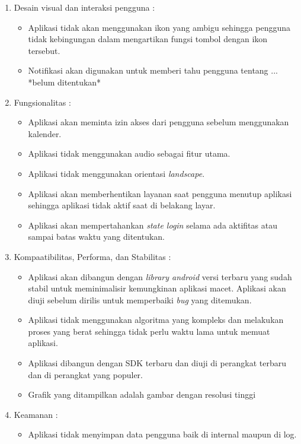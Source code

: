 \begin{enumerate}
    \item Desain visual dan interaksi pengguna : 
    \begin{itemize}
        \item Aplikasi tidak akan menggunakan ikon yang ambigu sehingga pengguna tidak kebingungan dalam mengartikan fungsi tombol dengan ikon tersebut. 
        \item Notifikasi akan digunakan untuk memberi tahu pengguna tentang  ...  *belum ditentukan*
    \end{itemize}
    \item Fungsionalitas : 
    \begin{itemize}
        \item Aplikasi akan meminta izin akses dari pengguna sebelum menggunakan kalender.
        \item Aplikasi tidak menggunakan audio sebagai fitur utama.
        \item Aplikasi tidak menggunakan orientasi \textit{landscape}.
        \item Aplikasi akan memberhentikan layanan saat pengguna menutup aplikasi sehingga aplikasi tidak aktif saat di belakang layar.
        \item Aplikasi akan mempertahankan \textit{state login} selama ada aktifitas atau sampai batas waktu yang ditentukan. 
    \end{itemize}
    \item Kompaatibilitas, Performa, dan Stabilitas : 
    \begin{itemize}
        \item Aplikasi akan dibangun dengan \textit{library android} versi terbaru yang sudah stabil untuk meminimalisir kemungkinan aplikasi macet. Aplikasi akan diuji sebelum dirilis untuk memperbaiki \textit{bug} yang ditemukan.
        \item Aplikasi tidak menggunakan algoritma yang kompleks dan melakukan proses yang berat sehingga tidak perlu waktu lama  untuk memuat aplikasi.
        \item Aplikasi dibangun dengan SDK terbaru dan diuji di perangkat terbaru dan di perangkat yang populer.
        \item Grafik yang ditampilkan adalah gambar dengan resolusi tinggi 
    \end{itemize}
    \item Keamanan : 
    \begin{itemize}
        \item Aplikasi tidak menyimpan data pengguna baik di internal maupun di log.

\end{itemize}
\end{enumerate}
